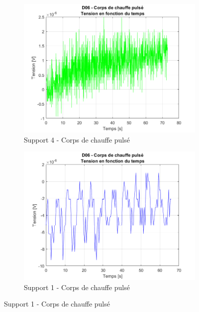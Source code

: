\begin{figure}[H]
    \hspace{-0.5cm}
    \begin{subfigure}[b]{0.45\textwidth}
        \includegraphics[scale = 0.45]{assets/figures/D06_corps_chauffe_pulse_green.png}
        \caption{Support 4 - Corps de chauffe pulsé}
        \label{fig:chauffe_pulse_g}
    \end{subfigure}
    \begin{subfigure}[b]{0.45\textwidth}
        \includegraphics[scale = 0.45]{assets/figures/D06_corps_chauffe_pulse_blue.png}
        \caption{Support 1 - Corps de chauffe pulsé}
        \label{fig:chauffe_pulse_b}
    \end{subfigure}
\end{figure}

